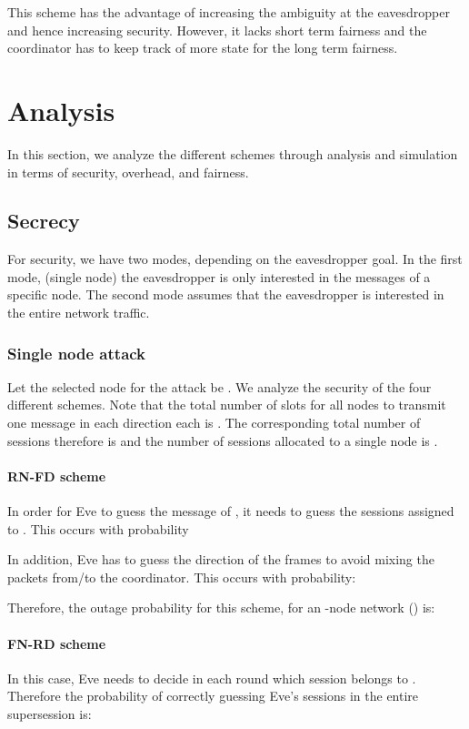 \documentclass[10pt,letterpaper,conference]{IEEEtran}
\begin{document}
This scheme has the advantage of increasing the ambiguity at the
eavesdropper and hence increasing security. However, it lacks short term
fairness and the coordinator has to keep track of more state for the long term
fairness.

\section{Analysis}
\label{sec:analysis}
In this section, we analyze the different schemes through analysis and
simulation in terms of security, overhead, and fairness.
\subsection{Secrecy}

For security, we have two modes, depending on the eavesdropper goal. In the
first mode, (single node) the eavesdropper is only interested in the messages of
a specific node. The second mode assumes that the eavesdropper is interested in
the entire network traffic.

\subsubsection{Single node attack}
Let the selected node for the attack be . We analyze the security of the four
different schemes. Note that the total number of slots for all nodes to transmit
one message in each direction each is . The corresponding total number of sessions therefore
is  and the number of sessions allocated to a single node is
.

\paragraph{\textbf{RN-FD scheme}}
In order for Eve to guess the message of , it needs to guess the sessions
assigned to . This occurs with probability



In addition, Eve has to guess the direction of the frames to avoid mixing the
packets from/to the coordinator. This occurs with probability:


Therefore, the outage probability for this scheme, for an -node network
() is:


\paragraph{\textbf{FN-RD scheme}}
In this case, Eve needs to decide in each round which session belongs to .
Therefore the probability of correctly guessing Eve's sessions in the entire
supersession is:
\end{document}
